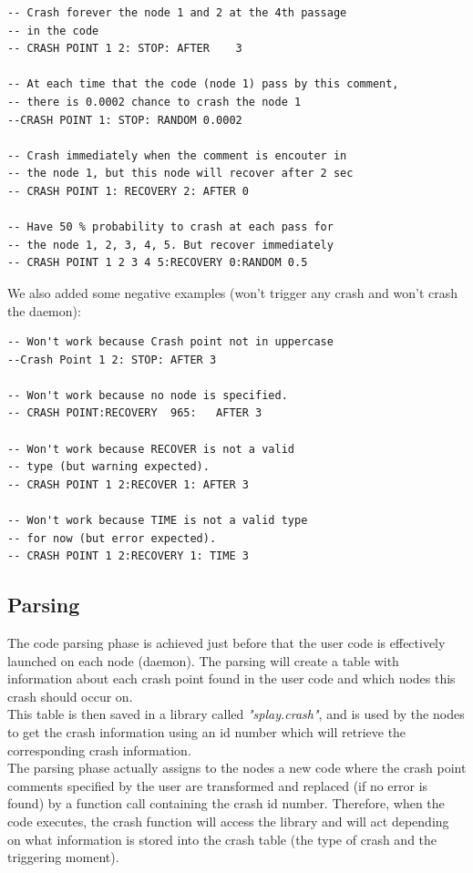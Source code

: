 \documentclass{eplmastersthesis}
\begin{document}
        \begin{lstlisting}[style=MyLua]
-- Crash forever the node 1 and 2 at the 4th passage
-- in the code
-- CRASH POINT 1 2: STOP: AFTER    3

-- At each time that the code (node 1) pass by this comment,
-- there is 0.0002 chance to crash the node 1
--CRASH POINT 1: STOP: RANDOM 0.0002

-- Crash immediately when the comment is encouter in
-- the node 1, but this node will recover after 2 sec
-- CRASH POINT 1: RECOVERY 2: AFTER 0

-- Have 50 % probability to crash at each pass for
-- the node 1, 2, 3, 4, 5. But recover immediately
-- CRASH POINT 1 2 3 4 5:RECOVERY 0:RANDOM 0.5
          \end{lstlisting}

        We also added some negative examples (won't trigger any crash
        and won't crash the daemon):

        \begin{lstlisting}[style=MyLua]
-- Won't work because Crash point not in uppercase
--Crash Point 1 2: STOP: AFTER 3

-- Won't work because no node is specified.
-- CRASH POINT:RECOVERY  965:   AFTER 3

-- Won't work because RECOVER is not a valid
-- type (but warning expected).
-- CRASH POINT 1 2:RECOVER 1: AFTER 3

-- Won't work because TIME is not a valid type
-- for now (but error expected).
-- CRASH POINT 1 2:RECOVERY 1: TIME 3
        \end{lstlisting}

      \subsection{Parsing}

        The code parsing phase is achieved just before that the user code
        is effectively launched on each node (daemon). The parsing will
        create a table with information about each crash point found in the
        user code and which nodes this crash should occur on.\\
        This table is then saved in a library called \textit{"splay.crash"},
        and is used by the nodes to get the crash information using an id
        number which will retrieve the corresponding crash information.\\

        The parsing phase actually assigns to the nodes a new code where the
        crash point comments specified by the user are transformed and
        replaced (if no error is found) by a function call containing the
        crash id number. Therefore, when the code executes, the crash
        function will access the library and will act depending on what
        information is stored into the crash table (the type of crash and
        the triggering moment).
\end{document}

